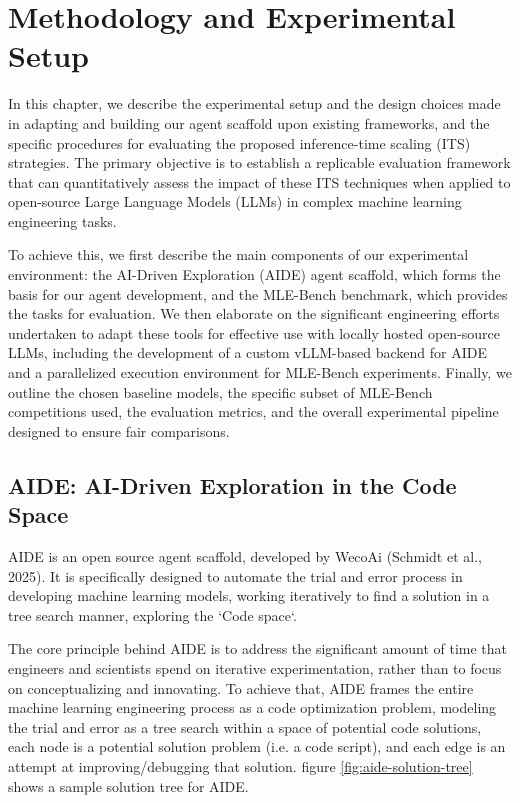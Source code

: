 \chapter{Methodology and Experimental Setup}

In this chapter, we describe the experimental setup and the design choices made in adapting and building our agent scaffold upon existing frameworks, and the specific procedures for evaluating the proposed inference-time scaling (ITS) strategies. The primary objective is to establish a replicable evaluation framework that can quantitatively assess the impact of these ITS techniques when applied to open-source Large Language Models (LLMs) in complex machine learning engineering tasks.

To achieve this, we first describe the main components of our experimental environment: the AI-Driven Exploration (AIDE) agent scaffold, which forms the basis for our agent development, and the MLE-Bench benchmark, which provides the tasks for evaluation. We then elaborate on the significant engineering efforts undertaken to adapt these tools for effective use with locally hosted open-source LLMs, including the development of a custom vLLM-based backend for AIDE and a parallelized execution environment for MLE-Bench experiments. Finally, we outline the chosen baseline models, the specific subset of MLE-Bench competitions used, the evaluation metrics, and the overall experimental pipeline designed to ensure fair comparisons.

\section{AIDE: AI-Driven Exploration in the Code Space}
AIDE is an open source agent scaffold, developed by WecoAi (Schmidt et al., 2025). It is specifically designed to automate the trial and error process in developing machine learning models, working iteratively to find a solution in a tree search manner, exploring the `Code space`. 


The core principle behind AIDE is to address the significant amount of time that engineers and scientists spend on iterative experimentation, rather than to focus on conceptualizing and innovating.  To achieve that, AIDE frames the entire machine learning engineering process as a code optimization problem, modeling the trial and error as a tree search within a space of potential code solutions, each node is a potential solution problem (i.e. a code script), and each edge is an attempt at improving/debugging that solution. figure \ref{fig:aide-solution-tree} shows a sample solution tree for AIDE.

